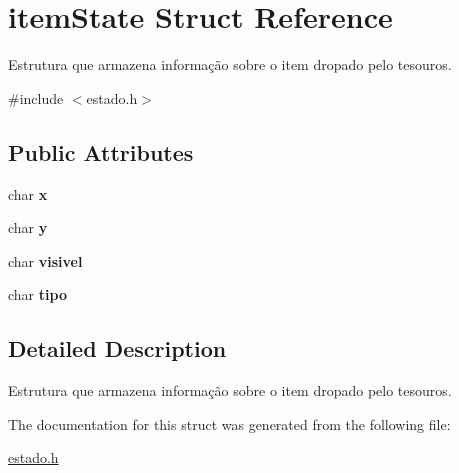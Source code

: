 \hypertarget{structitemState}{}\section{item\+State Struct Reference}
\label{structitemState}


Estrutura que armazena informação sobre o item dropado pelo tesouros.  




{\ttfamily \#include $<$estado.\+h$>$}

\subsection*{Public Attributes}
\begin{DoxyCompactItemize}
\item 
char {\bfseries x}\hypertarget{structitemState_a8931ef2ebfbd4776990cf05caa547f0f}{}\label{structitemState_a8931ef2ebfbd4776990cf05caa547f0f}

\item 
char {\bfseries y}\hypertarget{structitemState_a1f160917dad98a620b0461d7e32f3398}{}\label{structitemState_a1f160917dad98a620b0461d7e32f3398}

\item 
char {\bfseries visivel}\hypertarget{structitemState_aeecadbd68c18971c6ea58544f47988d5}{}\label{structitemState_aeecadbd68c18971c6ea58544f47988d5}

\item 
char {\bfseries tipo}\hypertarget{structitemState_a9c43b34d0071d8d187d6f06c98e84654}{}\label{structitemState_a9c43b34d0071d8d187d6f06c98e84654}

\end{DoxyCompactItemize}


\subsection{Detailed Description}
Estrutura que armazena informação sobre o item dropado pelo tesouros. 

The documentation for this struct was generated from the following file\+:\begin{DoxyCompactItemize}
\item 
\hyperlink{estado_8h}{estado.\+h}\end{DoxyCompactItemize}
